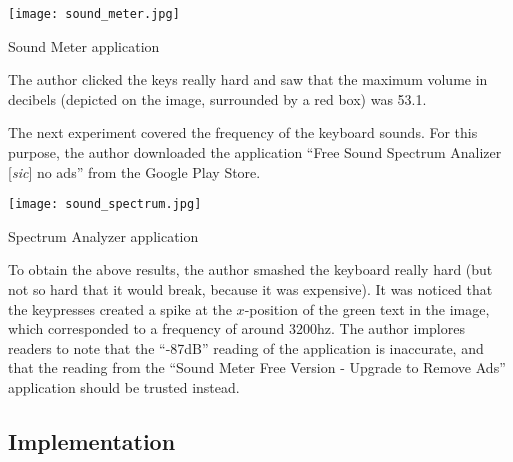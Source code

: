 \documentclass{article}
\begin{document}
\begin{multicols}{2}

\begin{center}
\texttt{[image: sound\_meter.jpg]}\end{center}
\begin{center}\small Sound Meter application \end{center}


The author clicked the keys really hard and saw that the maximum volume in decibels (depicted on the image, surrounded by a red box) was 53.1. 

The next experiment covered the frequency of the keyboard sounds. For this purpose, the author downloaded the application ``Free Sound Spectrum Analizer [\emph{sic}] no ads'' from the Google Play Store. \\

\begin{center}
\texttt{[image: sound\_spectrum.jpg]} \end{center}
\begin{center}\small Spectrum Analyzer application \end{center}

To obtain the above results, the author smashed the keyboard really hard (but not so hard that it would break, because it was expensive). It was noticed that the keypresses created a spike at the $x$-position of the green text in the image, which corresponded to a frequency of around 3200hz. The author implores readers to note that the ``-87dB'' reading of the application is inaccurate, and that the reading from the ``Sound Meter Free Version - Upgrade to Remove Ads'' application should be trusted instead.

\subsection{Implementation}


\end{multicols}
\end{document}
